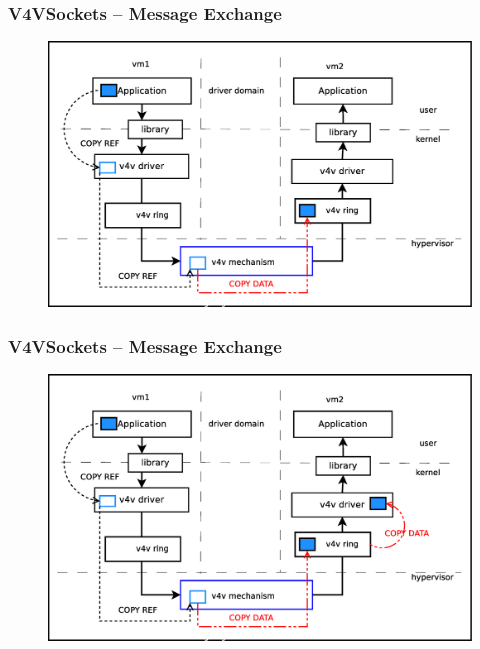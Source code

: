 \documentclass[red,slidestop,notes,compress,mathserif]{beamer}
\begin{document}
\begin{frame}
\frametitle{V4VSockets -- Message Exchange}
\begin{figure}
\includegraphics[scale=0.30]{figures/v4vsockets2.eps}
\end{figure}
\end{frame}

\begin{frame}
\frametitle{V4VSockets -- Message Exchange}
\begin{figure}
\includegraphics[scale=0.30]{figures/v4vsockets1.eps}
\end{figure}
\end{frame}
\end{document}

